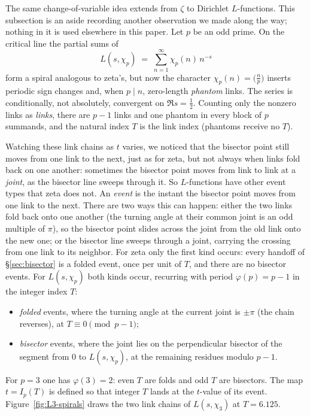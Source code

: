 \documentclass[11pt]{article}
\theoremstyle{definition}
\begin{document}
The same change-of-variable idea extends from $\zeta$ to Dirichlet
$L$-functions. This subsection is an aside recording another observation
we made along the way; nothing in it is used elsewhere in this paper.
Let $p$ be an odd prime. On the critical line the partial sums of
\begin{equation}\label{eq:Lchi}
L(s,\chi_p)
\;=\;
\sum_{n=1}^{\infty}\chi_p(n)\,n^{-s}
\end{equation}
form a spiral analogous to zeta's, but now the character
$\chi_p(n)=\bigl(\tfrac{n}{p}\bigr)$ inserts periodic sign changes and, when
$p\mid n$, zero-length \emph{phantom} links. The series is conditionally,
not absolutely, convergent on $\Re s=\tfrac12$. Counting only the nonzero links as \emph{links},
there are $p-1$ links and one phantom in every block of $p$ summands, and
the natural index $T$ is the link index (phantoms receive no $T$).

Watching these link chains as $t$ varies, we noticed that the bisector point
still moves from one link to the next, just as for zeta, but not always when
links fold back on one another: sometimes the bisector point moves from link to link at a
\emph{joint}, as the bisector line sweeps through it. So $L$-functions have
other event types that zeta does not. An \emph{event} is the instant the
bisector point moves from one link to the next. There are two ways this can
happen: either the two
links fold back onto one another (the turning angle at their common joint is
an odd multiple of $\pi$), so the bisector point slides across the joint from
the old link onto the new one; or the bisector line sweeps through a joint,
carrying the crossing from one link to its neighbor. For zeta only the first
kind occurs: every handoff of \S\ref{sec:bisector} is a folded event, once
per unit of $T$, and there are no bisector events. For $L(s,\chi_p)$ both
kinds occur, recurring with period $\varphi(p)=p-1$ in the integer index $T$:
\begin{itemize}
\item \emph{folded} events, where the turning angle at the current joint is
$\pm\pi$ (the chain reverses), at $T\equiv0\pmod{p-1}$;
\item \emph{bisector} events, where the joint lies on the perpendicular
bisector of the segment from $0$ to $L(s,\chi_p)$, at the remaining residues
modulo $p-1$.
\end{itemize}
For $p=3$ one has $\varphi(3)=2$: even $T$ are folds and odd $T$ are
bisectors. The map $t=I_p(T)$ is defined so that integer $T$ lands at the
$t$-value of its event. Figure~\ref{fig:L3-spirals} draws the two link
chains of $L(s,\chi_3)$ at $T=6.125$.
\end{document}
